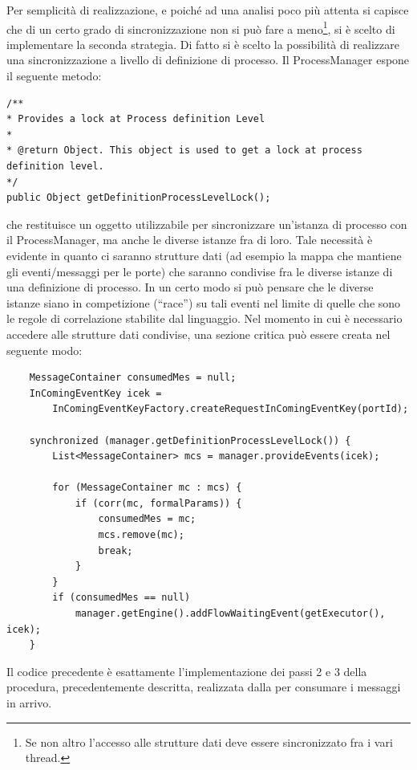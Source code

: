 Per semplicità di realizzazione, e poiché ad una analisi poco più attenta si
capisce che di un certo grado di sincronizzazione non si può fare a
meno\footnote{Se non altro l'accesso alle strutture dati deve essere
sincronizzato fra i vari thread.}, si \`e scelto di implementare la seconda
strategia. Di fatto si \`e scelto la possibilità di realizzare una
sincronizzazione a livello di definizione di processo. Il ProcessManager espone
il seguente metodo:
\begin{lstlisting}
/**
* Provides a lock at Process definition Level
* 
* @return Object. This object is used to get a lock at process definition level.
*/
public Object getDefinitionProcessLevelLock();
\end{lstlisting}
che restituisce un oggetto utilizzabile per sincronizzare
un'istanza di processo con il ProcessManager, ma anche le diverse istanze fra
di loro. Tale necessità \`e evidente in quanto ci saranno strutture dati (ad
esempio la mappa che mantiene gli eventi/messaggi per le porte) che saranno 
condivise fra le diverse istanze di una definizione di processo. In un certo
modo  si può pensare che le diverse istanze siano in competizione (``race'') su
tali eventi nel limite di quelle che sono le regole di correlazione stabilite
dal  linguaggio. Nel momento in cui è necessario accedere alle strutture dati
condivise, una sezione critica può essere creata nel seguente modo:
\label{cod:wait}
\begin{lstlisting}
   	MessageContainer consumedMes = null;
	InComingEventKey icek = 
		InComingEventKeyFactory.createRequestInComingEventKey(portId);

	synchronized (manager.getDefinitionProcessLevelLock()) {
		List<MessageContainer> mcs = manager.provideEvents(icek);

		for (MessageContainer mc : mcs) {
			if (corr(mc, formalParams)) {
				consumedMes = mc;
				mcs.remove(mc); 
				break;
			}
     	}
		if (consumedMes == null)
			manager.getEngine().addFlowWaitingEvent(getExecutor(), icek);
   	}
\end{lstlisting}

Il codice precedente è esattamente l'implementazione dei passi 2 e 3 della
procedura, precedentemente descritta, realizzata dalla 
per consumare i messaggi in arrivo.
\\

